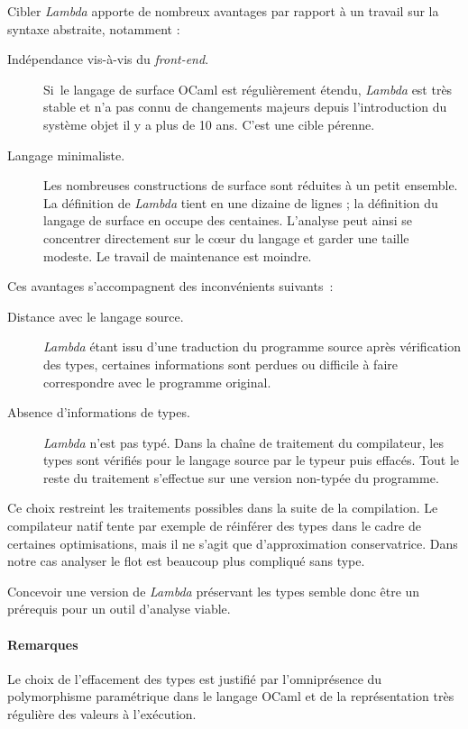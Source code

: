Cibler \emph{Lambda} apporte de nombreux avantages par rapport à un travail sur
la syntaxe abstraite, notamment :
\begin{description}
  \item[Indépendance vis-à-vis du \emph{front-end}.] Si le langage de surface 
    OCaml est régulièrement étendu, \emph{Lambda} est très stable et n'a pas
    connu de changements majeurs depuis l'introduction du système objet il y a
    plus de 10 ans. C'est une cible pérenne.
  \item[Langage minimaliste.]
    Les nombreuses constructions de surface sont réduites à un petit ensemble.
		La définition de \emph{Lambda} tient en une dizaine de lignes ;
		la définition du langage de surface en occupe des centaines.
    L'analyse peut ainsi se concentrer directement sur le cœur du langage et
    garder une taille modeste. Le travail de maintenance est moindre.
\end{description}

Ces avantages s'accompagnent des inconvénients suivants :
\begin{description}
  \item[Distance avec le langage source.] \emph{Lambda} étant issu d'une
    traduction du programme source après vérification des types, certaines
    informations sont perdues ou difficile à faire correspondre avec le
    programme original. 
  \item[Absence d'informations de types.] \emph{Lambda} n'est pas typé. Dans la
    chaîne de traitement du compilateur, les types sont vérifiés pour le
    langage source par le typeur puis effacés. Tout le reste du traitement
    s'effectue sur une version non-typée du programme. 
\end{description}


Ce choix restreint les traitements possibles dans la suite de la compilation.
Le compilateur natif tente par exemple de réinférer des types dans le cadre de
certaines optimisations, mais il ne s'agit que d'approximation conservatrice.
Dans notre cas analyser le flot est beaucoup plus compliqué sans type.

Concevoir une version de \emph{Lambda} préservant les types semble donc être un
prérequis pour un outil d'analyse viable.

\paragraph{Remarques} Le choix de l'effacement des types est justifié par
l'omniprésence du polymorphisme paramétrique dans le langage OCaml et de la
représentation très régulière des valeurs à l'exécution.

